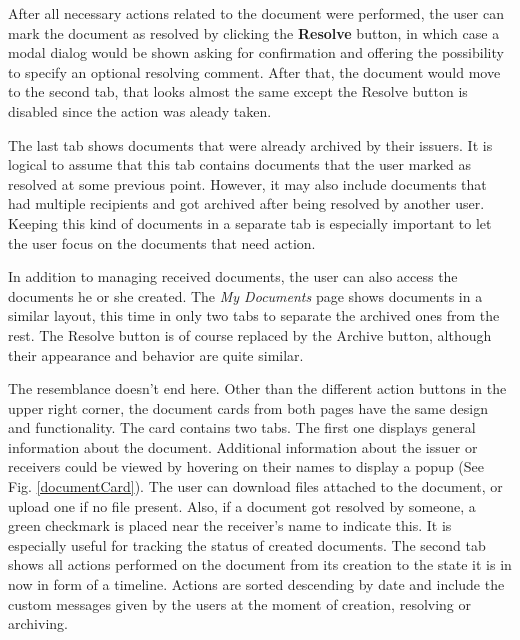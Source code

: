 After all necessary actions related to the document were performed, the user can mark the document as resolved by clicking the \textbf{Resolve} button, in which case a modal dialog would be shown asking for confirmation and offering the possibility to specify an optional resolving comment. After that, the document would move to the second tab, that looks almost the same except the Resolve button is disabled since the action was aleady taken.

The last tab shows documents that were already archived by their issuers. It is logical to assume that this tab contains documents that the user marked as resolved at some previous point. However, it may also include documents that had multiple recipients and got archived after being resolved by another user. Keeping this kind of documents in a separate tab is especially important to let the user focus on the documents that need action.

In addition to managing received documents, the user can also access the documents he or she created. The \textit{My Documents} page shows documents in a similar layout, this time in only two tabs to separate the archived ones from the rest. The Resolve button is of course replaced by the Archive button, although their appearance and behavior are quite similar.

The resemblance doesn't end here. Other than the different action buttons in the upper right corner, the document cards from both pages have the same design and functionality. The card contains two tabs. The first one displays general information about the document. Additional information about the issuer or receivers could be viewed by hovering on their names to display a popup (See Fig. \ref{documentCard}).  The user can download files attached to the document, or upload one if no file present. Also, if a document got resolved by someone, a green checkmark is placed near the receiver's name to indicate this. It is especially useful for tracking the status of created documents. The second tab shows all actions performed on the document from its creation to the state it is in now in form of a timeline. Actions are sorted descending by date and include the custom messages given by the users at the moment of creation, resolving or archiving.

